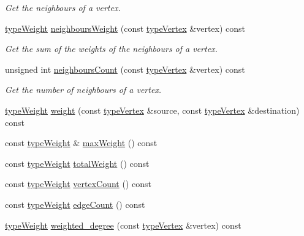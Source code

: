 \begin{DoxyCompactItemize}
\begin{DoxyCompactList}\small\item\em Get the neighbours of a vertex. \end{DoxyCompactList}\item 
\hyperlink{edge_8h_a2e7ea3be891ac8b52f749ec73fee6dd2}{type\+Weight} \hyperlink{classGraphUndirected_aa6c4a4b19efb152de6cdc21d67ac5eed}{neighbours\+Weight} (const \hyperlink{edge_8h_a5fbd20c46956d479cb10afc9855223f6}{type\+Vertex} \&vertex) const
\begin{DoxyCompactList}\small\item\em Get the sum of the weights of the neighbours of a vertex. \end{DoxyCompactList}\item 
unsigned int \hyperlink{classGraphUndirected_a6377b3a1a0d05fa1f96abb6e4b4b8792}{neighbours\+Count} (const \hyperlink{edge_8h_a5fbd20c46956d479cb10afc9855223f6}{type\+Vertex} \&vertex) const
\begin{DoxyCompactList}\small\item\em Get the number of neighbours of a vertex. \end{DoxyCompactList}\item 
\hyperlink{edge_8h_a2e7ea3be891ac8b52f749ec73fee6dd2}{type\+Weight} \hyperlink{classGraphUndirected_ae40d431c92d8b4884c7915c44d42f356}{weight} (const \hyperlink{edge_8h_a5fbd20c46956d479cb10afc9855223f6}{type\+Vertex} \&source, const \hyperlink{edge_8h_a5fbd20c46956d479cb10afc9855223f6}{type\+Vertex} \&destination) const
\item 
const \hyperlink{edge_8h_a2e7ea3be891ac8b52f749ec73fee6dd2}{type\+Weight} \& \hyperlink{classGraphUndirected_a7c21f40748eef95d1c35be892ab10ce2}{max\+Weight} () const
\item 
const \hyperlink{edge_8h_a2e7ea3be891ac8b52f749ec73fee6dd2}{type\+Weight} \hyperlink{classGraphUndirected_a41ba96531c669461dbc7e11ee35796ab}{total\+Weight} () const
\item 
const \hyperlink{edge_8h_a2e7ea3be891ac8b52f749ec73fee6dd2}{type\+Weight} \hyperlink{classGraphUndirected_adf50305970536f71586f8f63462dfcdc}{vertex\+Count} () const
\item 
const \hyperlink{edge_8h_a2e7ea3be891ac8b52f749ec73fee6dd2}{type\+Weight} \hyperlink{classGraphUndirected_acc533831ee3234a03a1cc0037b017a83}{edge\+Count} () const
\item 
\hyperlink{edge_8h_a2e7ea3be891ac8b52f749ec73fee6dd2}{type\+Weight} \hyperlink{classGraphUndirected_ad2b1cd9a6dded42bd5431134aba26612}{weighted\+\_\+degree} (const \hyperlink{edge_8h_a5fbd20c46956d479cb10afc9855223f6}{type\+Vertex} \&vertex) const

\end{DoxyCompactItemize}
